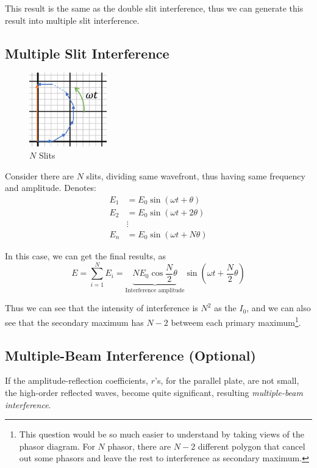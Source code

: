 \documentclass[UTF8]{book}
\begin{document}
This result is the same as the double slit interference, thus we can generate this result into multiple slit interference.


\subsection{Multiple Slit Interference}
\begin{figure}
  \vspace{-20pt}
  \begin{center}
    \includegraphics[width=0.3\textwidth]{Figure/Phasor_2.PNG}
  \end{center}  
  \vspace{-20pt}
  \caption{$N$ Slits}
  \vspace{-70pt}
  \label{fig:Phasor Diagram2}
\end{figure}
Consider there are $N$ slits, dividing same wavefront, thus having same frequency and amplitude. Denotes:
\begin{align*}
E_1&=E_0\sin \left(\omega t+\theta\right)\\
E_2&=E_0\sin \left(\omega t+2\theta \right)\\
&\vdots\\
E_n&=E_0\sin \left(\omega t+N\theta \right)
\end{align*}

In this case, we can get the final results, as 
\[E=\sum _{i=1}^{N}E_i=\underbrace{NE_0\cos \frac{N}{2}\theta }_\text{Interference amplitude}\sin \left(\omega t+\frac{N}{2}\theta\right)\]

Thus we can see that the intensity of interference is $N^2$ as the $I_0$, and we can also see that the secondary maximum has $N-2$ betweem each primary maximum\footnote{This question would be so much easier to understand by taking views of the phasor diagram. For $N$ phasor, there are $N-2$ different polygon that cancel out some phasors and leave the rest to interference as secondary maximum.}.



\subsection{Multiple-Beam Interference (Optional)}
If the amplitude-reflection coefficients, $r$'s, for the parallel plate, are not small, the high-order reflected waves, become quite significant, resulting \emph{multiple-beam interference}.
\end{document}
